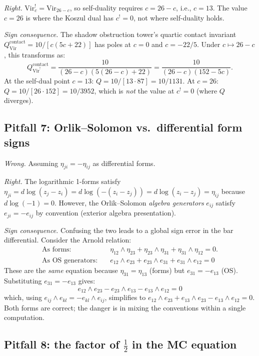 \emph{Right.} $\mathrm{Vir}_c^! = \mathrm{Vir}_{26 - c}$, so self-duality
requires $c = 26 - c$, i.e., $c = 13$. The value $c = 26$ is where the
Koszul dual has $c^! = 0$, not where self-duality holds.

\emph{Sign consequence.} The shadow obstruction tower's quartic contact invariant
$Q^{\mathrm{contact}}_{\mathrm{Vir}} = 10/[c(5c+22)]$ has poles at $c = 0$
and $c = -22/5$. Under $c \mapsto 26 - c$, this transforms as:
\[
Q^{\mathrm{contact}}_{\mathrm{Vir}^!}
= \frac{10}{(26-c)(5(26-c)+22)}
= \frac{10}{(26-c)(152-5c)}.
\]
At the self-dual point $c = 13$: $Q = 10/[13 \cdot 87] = 10/1131$.
At $c = 26$: $Q = 10/[26 \cdot 152] = 10/3952$, which is
\emph{not} the value at $c^! = 0$ (where $Q$ diverges).

\subsection{Pitfall 7: Orlik--Solomon vs.\ differential form signs}

\emph{Wrong.} Assuming $\eta_{ji} = -\eta_{ij}$ as differential forms.

\emph{Right.} The logarithmic 1-forms satisfy
$\eta_{ji} = d\log(z_j - z_i) = d\log(-(z_i - z_j)) = d\log(z_i - z_j) = \eta_{ij}$
because $d\log(-1) = 0$. However, the Orlik--Solomon \emph{algebra generators}
$e_{ij}$ satisfy $e_{ji} = -e_{ij}$ by convention (exterior algebra presentation).

\emph{Sign consequence.} Confusing the two leads to a global sign error
in the bar differential. Consider the Arnold relation:
\begin{align*}
\text{As forms:} &\quad \eta_{12}\wedge\eta_{23} + \eta_{23}\wedge\eta_{31} + \eta_{31}\wedge\eta_{12} = 0. \\
\text{As OS generators:} &\quad e_{12}\wedge e_{23} + e_{23}\wedge e_{31} + e_{31}\wedge e_{12} = 0
\end{align*}
These are the \emph{same} equation because $\eta_{31} = \eta_{13}$ (forms)
but $e_{31} = -e_{13}$ (OS). Substituting $e_{31} = -e_{13}$ gives:
\[
e_{12}\wedge e_{23} - e_{23}\wedge e_{13} - e_{13}\wedge e_{12} = 0
\]
which, using $e_{ij}\wedge e_{kl} = -e_{kl}\wedge e_{ij}$, simplifies to
$e_{12}\wedge e_{23} + e_{13}\wedge e_{23} - e_{13}\wedge e_{12} = 0$.
Both forms are correct; the danger is in mixing the conventions within a
single computation.

\subsection{Pitfall 8: the factor of $\frac{1}{2}$ in the MC equation}

